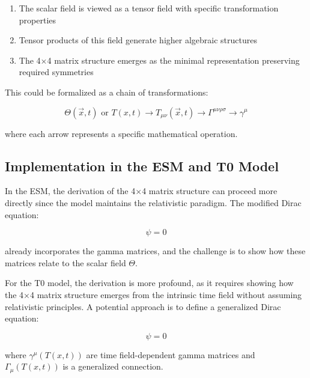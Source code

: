 \documentclass[12pt,a4paper]{article}
\newcommand{\Tfieldt}{T(x,t)}
\newcommand{\vecx}{\vec{x}}
\begin{document}
	\begin{enumerate}
		\item The scalar field is viewed as a tensor field with specific transformation properties
		\item Tensor products of this field generate higher algebraic structures
		\item The 4$\times$4 matrix structure emerges as the minimal representation preserving required symmetries
	\end{enumerate}
	
	This could be formalized as a chain of transformations:
	
	\begin{equation}
		\Theta(\vecx,t) \text{ or } \Tfieldt \rightarrow T_{\mu\nu}(\vecx,t) \rightarrow \Gamma^{\mu\nu\rho\sigma} \rightarrow \gamma^{\mu}
		\label{eq:tensor_chain}
	\end{equation}
	
	where each arrow represents a specific mathematical operation.
	
	\subsection{Implementation in the ESM and T0 Model}
	\label{subsec:implementation}
	
	In the ESM, the derivation of the 4$\times$4 matrix structure can proceed more directly since the model maintains the relativistic paradigm. The modified Dirac equation:
	
	\begin{equation}
		[i\gamma^{\mu}(\partial_{\mu} + \partial_{\mu}\Theta) - m]\psi = 0
		\label{eq:esm_dirac}
	\end{equation}
	
	already incorporates the gamma matrices, and the challenge is to show how these matrices relate to the scalar field $\Theta$.
	
	For the T0 model, the derivation is more profound, as it requires showing how the 4$\times$4 matrix structure emerges from the intrinsic time field without assuming relativistic principles. A potential approach is to define a generalized Dirac equation:
	
	\begin{equation}
		[i\gamma^{\mu}(\Tfieldt)(\partial_{\mu} + \Gamma_{\mu}(\Tfieldt)) - m]\psi = 0
		\label{eq:t0_dirac}
	\end{equation}
	
	where $\gamma^{\mu}(\Tfieldt)$ are time field-dependent gamma matrices and $\Gamma_{\mu}(\Tfieldt)$ is a generalized connection.
	
\end{document}

